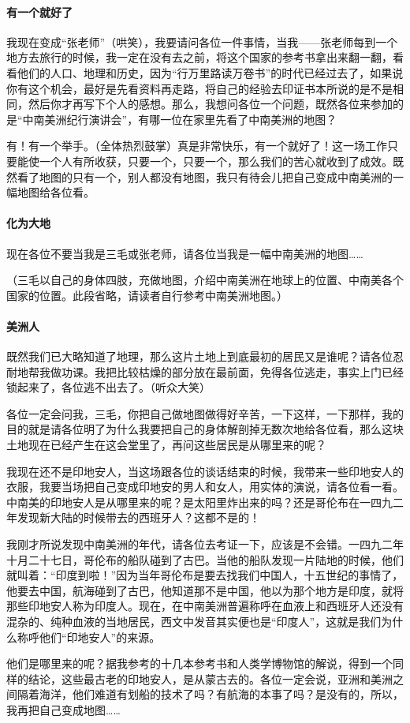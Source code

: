 \paragraph*{有一个就好了}
\par 我现在变成“张老师”（哄笑），我要请问各位一件事情，当我——张老师每到一个地方去旅行的时候，我一定在没有去之前，将这个国家的参考书拿出来翻一翻，看看他们的人口、地理和历史，因为“行万里路读万卷书”的时代已经过去了，如果说你有这个机会，最好是先看资料再走路，将自己的经验去印证书本所说的是不是相同，然后你才再写下个人的感想。那么，我想问各位一个问题，既然各位来参加的是“中南美洲纪行演讲会”，有哪一位在家里先看了中南美洲的地图？
\par 有！有一个举手。（全体热烈鼓掌）真是非常快乐，有一个就好了！这一场工作只要能使一个人有所收获，只要一个，只要一个，那么我们的苦心就收到了成效。既然看了地图的只有一个，别人都没有地图，我只有待会儿把自己变成中南美洲的一幅地图给各位看。
\paragraph*{化为大地}
\par 现在各位不要当我是三毛或张老师，请各位当我是一幅中南美洲的地图……
\par （三毛以自己的身体四肢，充做地图，介绍中南美洲在地球上的位置、中南美各个国家的位置。此段省略，请读者自行参考中南美洲地图。）
\paragraph*{美洲人}
\par 既然我们已大略知道了地理，那么这片土地上到底最初的居民又是谁呢？请各位忍耐地帮我做功课。我把比较枯燥的部分放在最前面，免得各位逃走，事实上门已经锁起来了，各位逃不出去了。（听众大笑）
\par 各位一定会问我，三毛，你把自己做地图做得好辛苦，一下这样，一下那样，我的目的就是请各位明了为什么我要把自己的身体解剖掉无数次地给各位看，那么这块土地现在已经产生在这会堂里了，再问这些居民是从哪里来的呢？
\par 我现在还不是印地安人，当这场跟各位的谈话结束的时候，我带来一些印地安人的衣服，我要当场把自己变成印地安的男人和女人，用实体的演说，请各位看一看。中南美的印地安人是从哪里来的呢？是太阳里炸出来的吗？还是哥伦布在一四九二年发现新大陆的时候带去的西班牙人？这都不是的！
\par 我刚才所说发现中南美洲的年代，请各位去考证一下，应该是不会错。一四九二年十月二十七日，哥伦布的船队碰到了古巴。当他的船队发现一片陆地的时候，他们就叫着：“印度到啦！”因为当年哥伦布是要去找我们中国人，十五世纪的事情了，他要去中国，航海碰到了古巴，他知道那不是中国，他以为那个地方是印度，就将那些印地安人称为印度人。现在，在中南美洲普遍称呼在血液上和西班牙人还没有混杂的、纯种血液的当地居民，西文中发音其实便也是“印度人”，这就是我们为什么称呼他们“印地安人”的来源。
\par 他们是哪里来的呢？据我参考的十几本参考书和人类学博物馆的解说，得到一个同样的结论，这些最古老的印地安人，是从蒙古去的。各位一定会说，亚洲和美洲之间隔着海洋，他们难道有划船的技术了吗？有航海的本事了吗？是没有的，所以，我再把自己变成地图……
